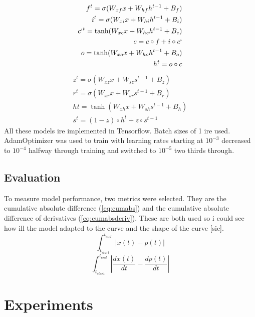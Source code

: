 \documentclass[11pt]{article}
\begin{document}
\begin{equation}
  \label{eq:LSTM_h}
\begin{split}
f^{t} = \sigma(W_{xf}x + W_{hf}h^{t-1}+B_f) \\
i^{t} = \sigma(W_{xi}x + W_{hi}h^{t-1}+B_i) \\
c`^{t } = \tanh(W_{xc}x+W_{hc}h^{t-1}+B_c) \\
c = c \circ f + i \circ c` \\
o= \tanh (W_{xo}x + W_{ho}h^{t-1} + B_o) \\
h^{t} = o \circ c  \\
\end{split}
\end{equation}
\begin{equation}
  \label{eq:GRU_h}
\begin{split}
  z^{t} = \sigma(W_{xz}x + W_{sz}s^{t-1} + B_z) \\
  r^{t} = \sigma(W_{xr}x + W_{sr}s^{t-1} + B_r) \\
  h{t} = \tanh(W_{xh}x + W_{sh}s^{t-1} + B_h) \\
  s^{t} = (1-z) \circ h^{t} + z \circ s^{t-1} 
  \end{split}
\end{equation}
All these models ire implemented in Tensorflow. Batch sizes of 1 ire
used. AdamOptimizer \cite{adam} was used to train with learning rates
starting at $10^{-3}$ decreased to $10^{-4}$ halfway through training
and switched to $10^{-5}$ two thirds through.

\subsection{Evaluation}
To measure model performance, two metrics were selected. They are
the cumulative absolute difference (\ref{eq:cumabs}) and the
cumulative absolute difference of derivatives
(\ref{eq:cumabsderiv}). These are both used so i could see how ill
the model adapted to the curve and the shape of the curve [sic].
\begin{equation}
\label{eq:cumabs}
  \int_{t_{start}}^{t_{end}} | x(t) - p(t) |
\end{equation}
\begin{equation}
\label{eq:cumabs}
  \int_{t_{start}}^{t_{end}} | \frac{dx(t)}{dt} - \frac{dp(t)}{dt} |
\end{equation}

  \section {Experiments}
\end{document}

